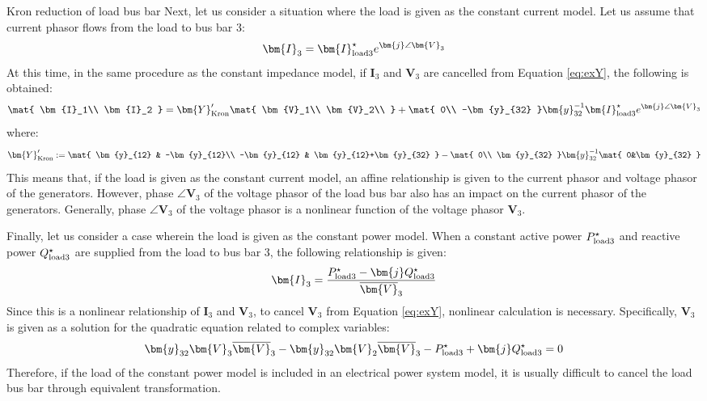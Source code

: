\documentclass[graybox, envcountchap]{svmult}
\begin{document}
\begin{example}{Kron reduction of load bus bar}
Next, let us consider a situation where the load is given as the constant current model.
Let us assume that current phasor flows from the load to bus bar 3:
\[
\bm{I}_3 = \bm{I}_{{\rm load}3}^{\star} e^{\bm{j} \angle \bm{V}_3}
\]
At this time, in the same procedure as the constant impedance model, if $\bm{I}_3$ and $\bm{V}_3$ 
are cancelled from Equation \ref{eq:exY}, the following is obtained:
\begin{equation*}
\mat{
\bm{I}_1\\
\bm{I}_2
}
=
\bm{Y}_{\rm Kron}'
\mat{
\bm{V}_1\\
\bm{V}_2\\
}
+
\mat{
0\\
-\bm{y}_{32}
}
\bm{y}_{32}^{-1}
\bm{I}_{{\rm load}3}^{\star} e^{\bm{j} \angle \bm{V}_3}
\end{equation*}
where:
\[
\bm{Y}_{\rm Kron}' :=
\mat{
\bm{y}_{12} & -\bm{y}_{12}\\
-\bm{y}_{12} & \bm{y}_{12}+\bm{y}_{32}
}
-
\mat{
0\\
\bm{y}_{32}
}
\bm{y}_{32}^{-1}
\mat{
0&\bm{y}_{32}
}
\]
This means that, if the load is given as the constant current model, an affine relationship is given to the current phasor and voltage phasor of the generators.
However, phase $\angle \bm{V}_3$ of the voltage phasor of the load bus bar also has an impact on the current phasor of the generators.
Generally, phase $\angle \bm{V}_3$ of the voltage phasor is a nonlinear function of the voltage phasor $\bm{V}_3$.


Finally, let us consider a case wherein the load is given as the constant power model.
When a constant active power $P_{{\rm load}3}^{\star}$ and reactive power $Q_{{\rm load}3}^{\star}$ are supplied from the load to bus bar 3, the following relationship is given:
\begin{equation*}
\bm{I}_3 = \frac{P_{{\rm load}3}^{\star} - \bm{j} Q_{{\rm load}3}^{\star} }{\overline{\bm{V}}_3}
\end{equation*}
Since this is a nonlinear relationship of $\bm{I}_3$ and $\bm{V}_3$, to cancel $\bm{V}_3$ from Equation \ref{eq:exY}, nonlinear calculation is necessary.
Specifically, $\bm{V}_3$ is given as a solution for the quadratic equation related to complex variables:
\begin{equation*}
\bm{y}_{32} \bm{V}_3 \overline{\bm{V}}_3 - \bm{y}_{32}  \bm{V}_2 \overline{\bm{V}}_3 -P_{{\rm load}3}^{\star} 
+ \bm{j} Q_{{\rm load}3}^{\star} =0
\end{equation*}
Therefore, if the load of the constant power model is included in an electrical power system model, it is usually difficult to cancel the load bus bar through equivalent transformation.
\end{example}
\end{document}
